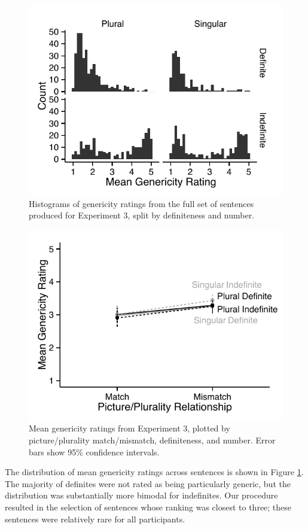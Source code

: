 \documentclass[10pt,letterpaper]{article}
\begin{document}
\begin{figure}[t]
\centering
\includegraphics[width=.9\linewidth]{figures/e3_norming_mod.pdf}
\caption{\label{fig:e3norming} Histograms of genericity ratings from the full set of sentences produced for Experiment 3, split by definiteness and number.} 
\end{figure}

\begin{figure}[t]
\centering
\includegraphics[width=.9\linewidth]{figures/e3_mod.pdf}
\caption{\label{fig:e3} Mean genericity ratings from Experiment 3, plotted by picture/plurality match/mismatch, definiteness, and number. Error bars show 95\% confidence intervals.} 
\end{figure}

The distribution of mean genericity ratings across sentences is shown in Figure \ref{fig:e3norming}. The majority of definites were not rated as being particularly generic, but the distribution was substantially more bimodal for indefinites. Our procedure resulted in the selection of sentences whose ranking was closest to three; these sentences were relatively rare for all participants.
\end{document}
